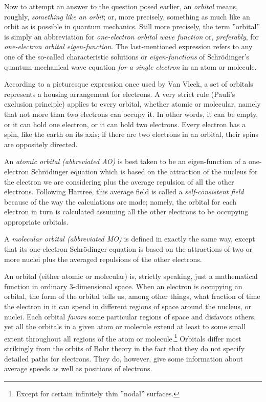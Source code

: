\documentclass[11pt]{memoir}
\begin{document}
Now to attempt an answer to the question posed earlier, an \emph{orbital} means, roughly, \emph{something like an orbit}; or, more precisely, {something as much like an orbit as is possible in quantum mechanics}.  Still more precisely, the term ''orbital'' is simply an abbreviation for \emph{one-electron orbital wave function} or, \emph{preferably}, for \emph{one-electron orbital eigen-function}.  The last-mentioned expression refers to any one of the so-called characteristic solutions or \emph{eigen-functions} of Schr\"{o}dinger's quantum-mechanical wave equation \emph{for a single electron} in an atom or molecule.

According to a picturesque expression once used by Van Vleck, a set of orbitals represents a housing arrangement for electrons.  A very strict rule (Pauli's exclusion principle) applies to every orbital, whether atomic or molecular, namely that not more than two electrons can occupy it.  In other words, it can be empty, or it can hold one electron, or it can hold two electrons.  Every electron has a spin, like the earth on its axis; if there are two electrons in an orbital, their spins are oppositely directed.

An \emph{atomic orbital (abbreviated AO)} is best taken to be an eigen-function of a one-electron Schr\"{o}dinger equation which is based on the attraction of the nucleus for the electron we are considering plus the average repulsion of all the other electrons.  Following Hartree, this average field is called a \emph{self-consistent field} because of the way the calculations are made; namely, the orbital for each electron in turn is calculated assuming all the other electrons to be occupying appropriate orbitals.

A \emph{molecular orbital (abbreviated MO)} is defined in exactly the same way, except that its one-electron Schr\"{o}dinger equation is based on the attractions of two or more nuclei plus the averaged repulsions of the other electrons.

An orbital (either atomic or molecular) is, strictly speaking, just a mathematical function in ordinary 3-dimensional space.  When an electron is occupying an orbital, the form of the orbital tells us, among other things, what fraction of time the electron in it can spend in different regions of space around the nucleus, or nuclei.  Each orbital \emph{favors} some particular regions of space and disfavors others, yet all the orbitals in a given atom or molecule extend at least to some small extent throughout all regions of the atom or molecule.\footnote{Except for certain infinitely thin ''nodal'' surfaces.}  Orbitals differ most strikingly from the orbits of Bohr theory in the fact that they do not specify detailed paths for electrons.  They do, however, give some information about average speeds as well as positions of electrons.
\end{document}
